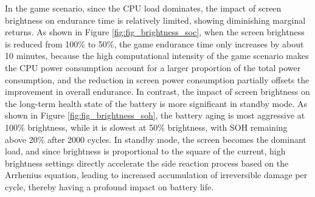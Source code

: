 \documentclass{mcmthesis}
\begin{document}
In the game scenario, since the CPU load dominates,
the impact of screen brightness on endurance time is relatively limited, showing diminishing marginal returns.
As shown in Figure \ref{fig:fig_brightness_soc},
when the screen brightness is reduced from 100\% to 50\%, the game endurance time only increases by about 10 minutes,
because the high computational intensity of the game scenario makes the CPU power consumption account for a larger proportion of the total power consumption,
and the reduction in screen power consumption partially offsets the improvement in overall endurance.
In contrast, the impact of screen brightness on the long-term health state of the battery is more significant in standby mode.
As shown in Figure \ref{fig:fig_brightness_soh},
the battery aging is most aggressive at 100\% brightness,
while it is slowest at 50\% brightness, with SOH remaining above 20\% after 2000 cycles.
In standby mode, the screen becomes the dominant load,
and since brightness is proportional to the square of the current,
high brightness settings directly accelerate the side reaction process based on the Arrhenius equation,
leading to increased accumulation of irreversible damage per cycle,
thereby having a profound impact on battery life.
\end{document}
